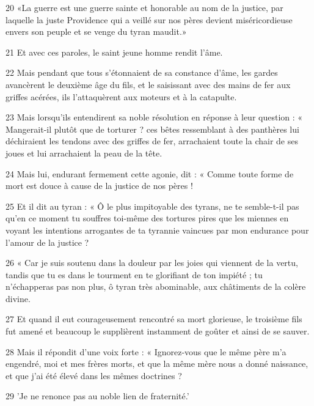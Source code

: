 \par 20 «La guerre est une guerre sainte et honorable au nom de la justice, par laquelle la juste Providence qui a veillé sur nos pères devient miséricordieuse envers son peuple et se venge du tyran maudit.»

\par 21 Et avec ces paroles, le saint jeune homme rendit l'âme.

\par 22 Mais pendant que tous s'étonnaient de sa constance d'âme, les gardes avancèrent le deuxième âge du fils, et le saisissant avec des mains de fer aux griffes acérées, ils l'attaquèrent aux moteurs et à la catapulte.

\par 23 Mais lorsqu'ils entendirent sa noble résolution en réponse à leur question : « Mangerait-il plutôt que de torturer ? ces bêtes ressemblant à des panthères lui déchiraient les tendons avec des griffes de fer, arrachaient toute la chair de ses joues et lui arrachaient la peau de la tête.

\par 24 Mais lui, endurant fermement cette agonie, dit : « Comme toute forme de mort est douce à cause de la justice de nos pères !

\par 25 Et il dit au tyran : « Ô le plus impitoyable des tyrans, ne te semble-t-il pas qu'en ce moment tu souffres toi-même des tortures pires que les miennes en voyant les intentions arrogantes de ta tyrannie vaincues par mon endurance pour l'amour de la justice ?

\par 26 « Car je suis soutenu dans la douleur par les joies qui viennent de la vertu, tandis que tu es dans le tourment en te glorifiant de ton impiété ; tu n'échapperas pas non plus, ô tyran très abominable, aux châtiments de la colère divine.

\par 27 Et quand il eut courageusement rencontré sa mort glorieuse, le troisième fils fut amené et beaucoup le supplièrent instamment de goûter et ainsi de se sauver.

\par 28 Mais il répondit d'une voix forte : « Ignorez-vous que le même père m'a engendré, moi et mes frères morts, et que la même mère nous a donné naissance, et que j'ai été élevé dans les mêmes doctrines ?

\par 29 'Je ne renonce pas au noble lien de fraternité.'

